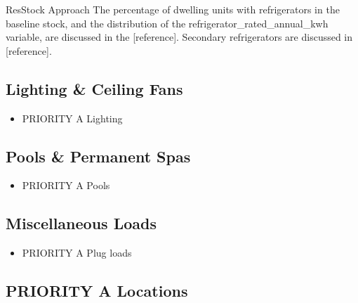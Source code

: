 {ResStock Approach}
    The percentage of dwelling units with refrigerators in the baseline stock, and the distribution of the refrigerator\_rated\_annual\_kwh variable, are discussed in the [reference].  Secondary refrigerators are discussed in [reference].
\subsection{Lighting \& Ceiling Fans}
\begin{itemize}
    \item PRIORITY A Lighting
\end{itemize}

\subsection{Pools \& Permanent Spas}
\begin{itemize}
    \item PRIORITY A Pools
\end{itemize}
\subsection{Miscellaneous Loads}
\begin{itemize}
    \item PRIORITY A Plug loads
\end{itemize}
\subsection{PRIORITY A Locations}
